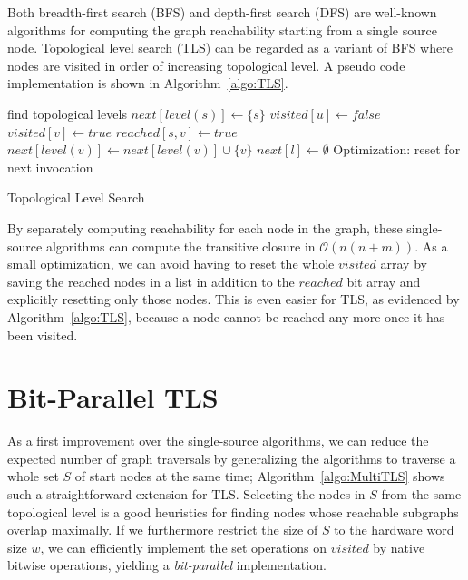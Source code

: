 \documentclass[12pt,a4paper,twoside]{article}
\begin{document}
Both breadth-first search (BFS) and depth-first search (DFS) are well-known algorithms for computing the graph reachability starting from a single source node. Topological level search (TLS) can be regarded as a variant of BFS where nodes are visited in order of increasing topological level. A pseudo code implementation is shown in Algorithm~\ref{algo:TLS}.

\begin{algorithm}
  \begin{algorithmic}
      \State find topological levels
      \State $next[level(s)] \gets \{s\}$
          \State $visited[u] \gets false$
              \State $visited[v] \gets true$
              \State $reached[s, v] \gets true$
              \State $next[level(v)] \gets next[level(v)] \cup \{v\}$
            \EndIf
          \EndFor
        \EndFor
        \State $next[l] \gets \emptyset$ \Comment Optimization: reset for next invocation
      \EndFor
    \EndFunction
  \end{algorithmic}
  \caption{Topological Level Search}
  \label{algo:TLS}
\end{algorithm}

By separately computing reachability for each node in the graph, these single-source algorithms can compute the transitive closure in $\mathcal{O}(n(n+m))$. As a small optimization, we can avoid having to reset the whole $visited$ array by saving the reached nodes in a list in addition to the $reached$ bit array and explicitly resetting only those nodes. This is even easier for TLS, as evidenced by Algorithm~\ref{algo:TLS}, because a node cannot be reached any more once it has been visited.

\section{Bit-Parallel TLS}

As a first improvement over the single-source algorithms, we can reduce the expected number of graph traversals by generalizing the algorithms to traverse a whole set $S$ of start nodes at the same time; Algorithm~\ref{algo:MultiTLS} shows such a straightforward extension for TLS. Selecting the nodes in $S$ from the same topological level is a good heuristics for finding nodes whose reachable subgraphs overlap maximally. If we furthermore restrict the size of $S$ to the hardware word size $w$, we can efficiently implement the set operations on $visited$ by native bitwise operations, yielding a \emph{bit-parallel} implementation.
\end{document}
